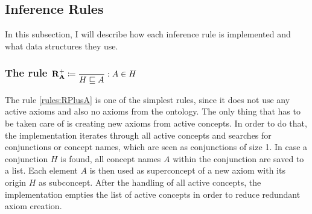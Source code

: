 \documentclass[titlepage]{article}
\begin{document}
\subsection{Inference Rules}\label{alg:rules}
In this subsection, I will describe how each inference rule is implemented and what data structures they use.

\subsubsection{The rule $\mathbf{R^{+}_A} \coloneq \dfrac{}{H\sqsubseteq A} : A \in H \label{rules:RPlusA}\\$}
The rule \ref{rules:RPlusA} is one of the simplest rules, since it does not use any active axioms and
also no axioms from the ontology. The only thing that has to be taken care of is
creating new axioms from active concepts. In order to do that, the implementation iterates
through all active concepts and searches for conjunctions or concept names, which are seen as conjunctions of size 1.
In case a conjunction $H$ is found, all concept names $A$ within the conjunction are saved to a list.
Each element $A$ is then used as superconcept of a new axiom with its origin $H$ as subconcept.
After the handling of all active concepts, the implementation empties the list of active concepts in order to
reduce redundant axiom creation.
\end{document}
